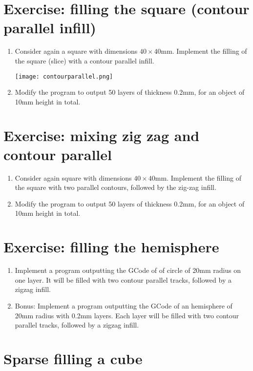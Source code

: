 \documentclass{article}
\begin{document}
\section{Exercise: filling the square (contour parallel infill)}

\begin{enumerate}
    \item Consider again a square with dimensions $40 \times 40$mm.
Implement the filling of the square (slice) with a contour parallel infill.

\begin{center}
\texttt{[image: contourparallel.png]}
\end{center}

\item Modify the program to output 50 layers of thickness 0.2mm, for an object of 10mm height in total.
\end{enumerate}

\section{Exercise: mixing zig zag and contour parallel}

\begin{enumerate}
\item Consider again square with dimensions $40 \times 40$mm.
Implement the filling of the square with two parallel contours, followed by the zig-zag infill.
\item Modify the program to output 50 layers of thickness 0.2mm, for an object of 10mm height in total.
\end{enumerate}

\section{Exercise: filling the hemisphere}

\begin{enumerate}
\item Implement a program outputting the GCode of of circle of 20mm radius on one layer. It will be filled with two contour parallel tracks, followed by a zigzag infill.
\item Bonus: Implement a program outputting the GCode of an hemisphere of 20mm radius with 0.2mm layers. Each layer will be filled with two contour parallel tracks, followed by a zigzag infill.
\end{enumerate}

\section{Sparse filling a cube}
\end{document}

